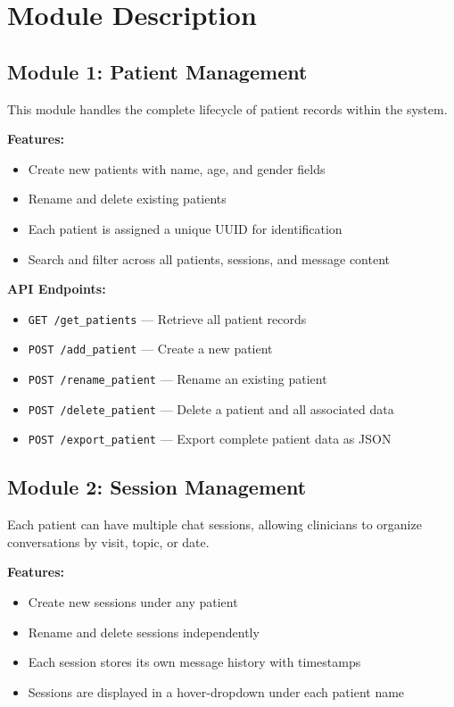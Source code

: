 \documentclass[12pt,a4paper]{report}
\begin{document}
\chapter{Module Description}

\section{Module 1: Patient Management}

This module handles the complete lifecycle of patient records within the system.

\textbf{Features:}
\begin{itemize}
    \item Create new patients with name, age, and gender fields
    \item Rename and delete existing patients
    \item Each patient is assigned a unique UUID for identification
    \item Search and filter across all patients, sessions, and message content
\end{itemize}

\textbf{API Endpoints:}
\begin{itemize}
    \item \texttt{GET /get\_patients} --- Retrieve all patient records
    \item \texttt{POST /add\_patient} --- Create a new patient
    \item \texttt{POST /rename\_patient} --- Rename an existing patient
    \item \texttt{POST /delete\_patient} --- Delete a patient and all associated data
    \item \texttt{POST /export\_patient} --- Export complete patient data as JSON
\end{itemize}

\section{Module 2: Session Management}

Each patient can have multiple chat sessions, allowing clinicians to organize conversations by visit, topic, or date.

\textbf{Features:}
\begin{itemize}
    \item Create new sessions under any patient
    \item Rename and delete sessions independently
    \item Each session stores its own message history with timestamps
    \item Sessions are displayed in a hover-dropdown under each patient name
\end{itemize}
\end{document}
